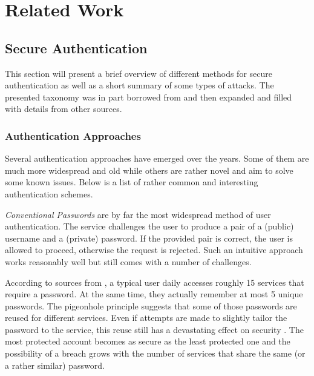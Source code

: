 \chapter{Related Work}
\label{chapter:related-work}

\section{Secure Authentication}
\label{sec:secure-authentication}

This section will present a brief overview of different methods for secure authentication as well as a short summary of some types of attacks. The presented taxonomy was in part borrowed from \cite{raza:2012:password-attacks-survey} and then expanded and filled with details from other sources.

\subsection{Authentication Approaches}
\label{subsec:authentication-approaches}

Several authentication approaches have emerged over the years. Some of them are much more widespread and old while others are rather novel and aim to solve some known issues. Below is a list of rather common and interesting authentication schemes.

\emph{Conventional Passwords} are by far the most widespread method of user authentication. The service challenges the user to produce a pair of a (public) username and a (private) password. If the provided pair is correct, the user is allowed to proceed, otherwise the request is rejected. Such an intuitive approach works reasonably well but still comes with a number of challenges.

 According to sources from \cite{ives:2004:domino}, a typical user daily accesses roughly 15 services that require a password. At the same time, they actually remember at most 5 unique passwords. The pigeonhole principle suggests that some of those passwords are reused for different services. Even if attempts are made to slightly tailor the password to the service, this reuse still has a devastating effect on security \cite{gaw2006password, shay2010encountering}. The most protected account becomes as secure as the least protected one and the possibility of a breach grows with the number of services that share the same (or a rather similar) password.

